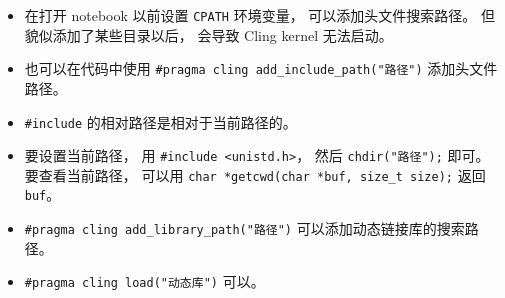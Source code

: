 \begin{itemize}
\item 在打开 notebook 以前设置 \verb`CPATH` 环境变量， 可以添加头文件搜索路径。 但貌似添加了某些目录以后， 会导致 Cling kernel 无法启动。
\item 也可以在代码中使用 \verb`#pragma cling add_include_path("路径")` 添加头文件路径。
\item \verb`#include` 的相对路径是相对于当前路径的。
\item 要设置当前路径， 用 \verb`#include <unistd.h>`， 然后 \verb`chdir("路径");` 即可。 要查看当前路径， 可以用 \verb`char *getcwd(char *buf, size_t size);` 返回 \verb`buf`。
\item \verb`#pragma cling add_library_path("路径")` 可以添加动态链接库的搜索路径。
\item \verb`#pragma cling load("动态库")` 可以。
\end{itemize}
